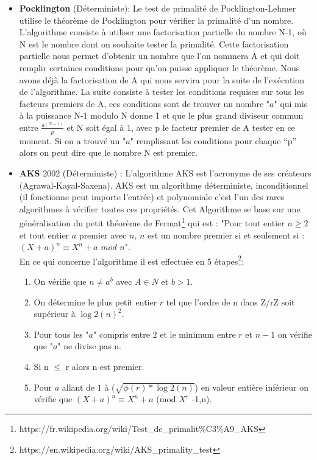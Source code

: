 \begin{itemize}
			\item \textbf{Pocklington} (Déterministe): Le test de primalité de Pocklington-Lehmer utilise le théorème de Pocklington pour vérifier la primalité d’un nombre.
L’algorithme consiste à utiliser une factorisation partielle du nombre N-1, où N est le nombre dont on souhaite tester la primalité. Cette factorisation partielle nous permet d’obtenir un nombre que l’on nommera A et qui doit remplir certaines conditions pour qu’on puisse appliquer le théorème.
Nous avons déjà la factorisation de A qui nous servira pour la suite de l'exécution de l’algorithme. 
La suite consiste à tester les conditions requises sur tous les facteurs premiers de A, ces conditions sont de trouver un nombre "$a$" qui mis à la puissance N-1 modulo N donne 1 et que le plus grand diviseur commun entre {\Large$\frac{a^{(N-1)}}{p}$} et N soit égal à 1, avec p le facteur premier de A tester en ce moment. Si on a trouvé un "$a$" remplissant les conditions pour chaque “p” alors on peut dire que le nombre N est premier.\\

			\item \textbf{AKS} 2002 (Déterministe) :			
			L'algorithme AKS est l’acronyme de ses créateurs (Agrawal-Kayal-Saxena). AKS est un algorithme déterministe, inconditionnel (il fonctionne peut importe l'entrée) et polynomiale c'est l'un des rares algorithmes à vérifier toutes ces propriétés. Cet Algorithme se base sur une généralisation du petit théorème de Fermat\footnote{https://fr.wikipedia.org/wiki/Test\_de\_primalit\%C3\%A9\_AKS} qui est : "Pour tout entier $n \geq 2$ et tout entier $a$ premier avec $n$, $n$ est un nombre premier si et seulement si : $(X + a)^n \equiv X^n + a$ $mod$ $n$".\\

En ce qui concerne l’algorithme il est effectuée en 5 étapes\footnote{https://en.wikipedia.org/wiki/AKS\_primality\_test}:\\
\begin{enumerate}
	\item On vérifie que $n \ne a^b$ avec $A \in N$ et $b>1$.
	\item On détermine le plus petit entier $r$ tel que l’ordre de n dans Z/rZ soit supérieur à $\log2(n)^2$.
	\item Pour tous les "$a$" compris entre 2 et le minimum entre $r$ et $n-1$ on vérifie que "$a$" ne divise pas n.
	\item Si n $\leq$ r alors n est premier.
	\item Pour $a$ allant de $1$ à ($\sqrt{\phi (r)*\log 2(n)}$) en valeur entière inférieur on vérifie que $(X + a)^n \equiv X^n + a$ (mod $X^r$ -1,n).
\end{enumerate}


\end{itemize}
